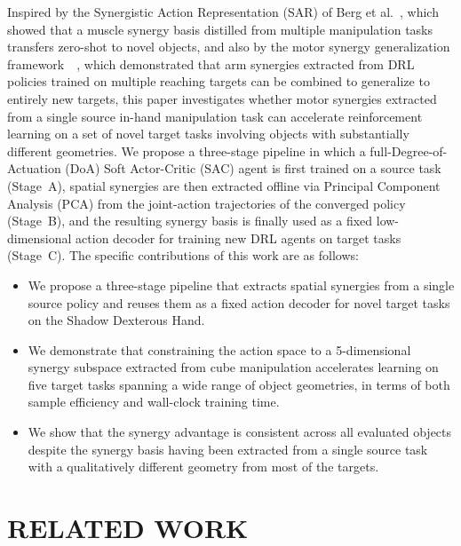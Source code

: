 \documentclass[letterpaper, 10 pt, conference]{ieeeconf}  %
\begin{document}
Inspired by the Synergistic Action Representation (SAR) of Berg et al.~\cite{c9}, 
which showed that a muscle synergy basis distilled from multiple manipulation 
tasks transfers zero-shot to novel objects, and also by
the motor synergy generalization framework~\cite{c8}~\cite{c19}, which demonstrated that arm 
synergies extracted from DRL policies trained on multiple reaching targets can 
be combined to generalize to entirely new targets, this paper investigates whether 
motor synergies extracted from a single source in-hand manipulation task can 
accelerate reinforcement learning on a set of novel target tasks 
involving objects with substantially different geometries.
We propose a three-stage pipeline in which a full-Degree-of-Actuation (DoA) 
Soft Actor-Critic (SAC) agent is first trained on a source task (Stage~A), spatial 
synergies are then extracted offline via Principal Component Analysis (PCA) from 
the joint-action trajectories of the converged policy (Stage~B), and the resulting 
synergy basis is finally used as a fixed low-dimensional action decoder for 
training new DRL agents on target tasks (Stage~C). The specific contributions of 
this work are as follows:
\begin{itemize}
    \item We propose a three-stage 
    pipeline that extracts spatial synergies from a single source policy and 
    reuses them as a fixed action decoder for novel target tasks on the Shadow 
    Dexterous Hand.
    \item We demonstrate that constraining the action space to a 5-dimensional 
    synergy subspace extracted from cube manipulation accelerates learning on five 
    target tasks spanning a wide range of object geometries, in terms of both 
    sample efficiency and wall-clock training time.
    \item We show that the synergy advantage is consistent across all evaluated 
    objects despite the synergy basis having been extracted from a single source 
    task with a qualitatively different geometry from most of the targets.
\end{itemize}

\section{RELATED WORK}
\end{document}
